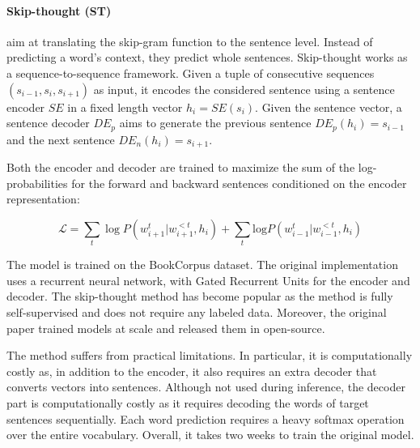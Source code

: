 

\paragraph{Skip-thought (ST)} \textcite{kiros_15} aim at translating the skip-gram function to the sentence level. Instead of predicting a word's context, they predict whole sentences. Skip-thought works as a sequence-to-sequence framework. Given a tuple of consecutive sequences $(s_{i-1}, s_i, s_{i+1})$ as input, it encodes the considered sentence using a sentence encoder $SE$ in a fixed length vector $h_i = SE(s_i)$. Given the sentence vector, a sentence decoder $DE_p$ aims to generate the previous sentence $DE_p(h_i) = s_{i-1}$ and the next sentence $DE_n(h_i) = s_{i+1}$.

Both the encoder and decoder are trained to maximize the sum of the log-probabilities for the forward and backward sentences conditioned on the encoder representation:

\begin{equation*}
    \mathcal{L} = \sum_t \log P(w_{i+1}^t | w_{i+1}^{<t}, h_i) + \sum_t \text{log} P(w_{i-1}^t | w_{i-1}^{<t}, h_i)
\end{equation*}

The model is trained on the BookCorpus dataset. The original implementation uses a recurrent neural network, with Gated Recurrent Units \parencite{cho_14} for the encoder and decoder. The skip-thought method has become popular as the method is fully self-supervised and does not require any labeled data. Moreover, the original paper trained models at scale and released them in open-source. 

The method suffers from practical limitations. In particular, it is computationally costly as, in addition to the encoder, it also requires an extra decoder that converts vectors into sentences. Although not used during inference, the decoder part is computationally costly as it requires decoding the words of target sentences sequentially. Each word prediction requires a heavy softmax operation over the entire vocabulary. Overall, it takes two weeks to train the original model.

